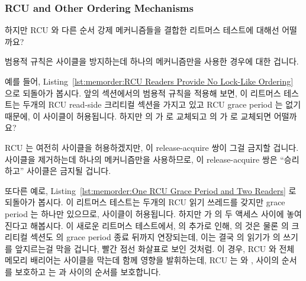 \subsubsection{RCU and Other Ordering Mechanisms}
\label{sec:memorder:RCU and Other Ordering Mechanisms}

하지만 RCU 와 다른 순서 강제 메커니즘들을 결합한 리트머스 테스트에 대해선
어떨까요?

범용적 규칙은 사이클을 방지하는데 하나의 메커니즘만을 사용한 경우에 대한
겁니다.

예를 들어,
Listing~\ref{lst:memorder:RCU Readers Provide No Lock-Like Ordering} 으로
되돌아가 봅시다.
앞의 섹션에서의 범용적 규칙을 적용해 보면, 이 리트머스 테스트는 두개의 RCU
read-side 크리티컬 섹션을 가지고 있고 RCU grace period 는 없기 때문에, 이
사이클이 허용됩니다.
하지만  의  가  로 교체되고
 의  가  로 교체되면 어떨까요?

RCU 는 여전히 사이클을 허용하겠지만, 이 release-acquire 쌍이 그걸 금지할
겁니다.
사이클을 제거하는데 하나의 메커니즘만을 사용하므로, 이 release-acquire 쌍은
``승리하고'' 사이클은 금지될 겁니다.

또다른 예로,
Listing~\ref{lst:memorder:One RCU Grace Period and Two Readers} 로 되돌아가
봅시다.
이 리트머스 테스트는 두개의 RCU 읽기 쓰레드를 갖지만 grace period 는 하나만
있으므로, 사이클이 허용됩니다.
하지만  가  의 두 액세스 사이에 놓여진다고 해봅시다.
이 새로운 리트머스 테스트에서,  의 추가로 인해,  의 것은
물론  의 크리티컬 섹션도  의 grace period 종료 뒤까지
연장되는데, 이는 결국  의  읽기가  의 쓰기를
앞지르는걸 막을 겁니다, 빨간 점선 화살표로 보인 것처럼.
이 경우, RCU 와 전체 메모리 배리어는 사이클을 막는데 함께 영향을 발휘하는데,
RCU 는  와 ,  사이의 순서를 보호하고 
는  과  사이의 순서를 보호합니다.
\iffalse

